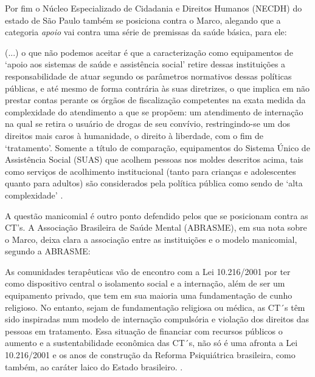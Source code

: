 \documentclass[
	12pt,				%
	oneside,			%
	a4paper,			%
	sumario=tradicional,
	english,			%
	brazil				%
	]{abntex2}
\begin{document}
Por fim o Núcleo Especializado de Cidadania e Direitos Humanos (NECDH) do estado de São Paulo também se posiciona contra o Marco, alegando que a categoria \emph{apoio} vai contra uma série de premissas da saúde básica, para ele:
\begin{quoting}[rightmargin=0cm,leftmargin=4cm]
\begin{singlespace}
{\footnotesize
(...) o que não podemos aceitar é que a caracterização como equipamentos de ‘apoio aos sistemas de saúde e assistência social’ retire dessas instituições a responsabilidade de atuar segundo os parâmetros normativos dessas políticas públicas, e até mesmo de forma contrária às suas diretrizes, o que implica em não prestar contas perante os órgãos de fiscalização competentes na exata medida da complexidade do atendimento a que se propõem: um atendimento de internação na qual se retira o usuário de drogas de seu convívio, restringindo-se um dos direitos mais caros à humanidade, o direito à liberdade, com o fim de ‘tratamento’. Somente a título de comparação, equipamentos do Sistema Único de Assistência Social (SUAS) que acolhem pessoas nos moldes descritos acima, tais como serviços de acolhimento institucional (tanto para crianças e adolescentes quanto para adultos) são considerados pela política pública como sendo de ‘alta complexidade’ \cite[p.03]{necdh2014}.}
\end{singlespace}
\end{quoting}
A questão manicomial é outro ponto defendido pelos que se posicionam contra as CT's. A Associação Brasileira de Saúde Mental (ABRASME), em sua nota sobre o Marco, deixa clara a associação entre as instituições e o modelo manicomial, segundo a ABRASME:
\begin{quoting}[rightmargin=0cm,leftmargin=4cm]
\begin{singlespace}
{\footnotesize
As comunidades terapêuticas vão de encontro com a Lei 10.216/2001 por ter como dispositivo central o isolamento social e a internação, além de ser um equipamento privado, que tem em sua maioria uma fundamentação de cunho religioso. No entanto, sejam de fundamentação religiosa ou médica, as CT´s têm sido inspiradas num modelo de internação compulsória e violação dos direitos das pessoas em tratamento. Essa situação de financiar com recursos públicos o aumento e a sustentabilidade econômica das CT´s, não só é uma afronta a Lei 10.216/2001 e os anos de construção da Reforma Psiquiátrica brasileira, como também, ao caráter laico do Estado brasileiro. \cite{abrasme2014}.}
\end{singlespace}
\end{quoting}
\end{document}
